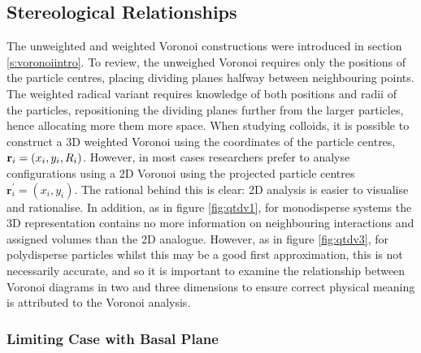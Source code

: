 \subsection{Stereological Relationships}
\label{sec:vorrel}

The unweighted and weighted Voronoi constructions were introduced in section \ref{s:voronoiintro}.
To review, the unweighed Voronoi requires only the positions of the particle centres, placing dividing planes halfway between neighbouring points.
The weighted radical variant requires knowledge of both positions and radii of the particles, repositioning the dividing planes further from the larger particles, hence allocating more them more space.
When studying \qtd{} colloids, it is possible to construct a 3D weighted Voronoi using the coordinates of the particle centres, $\mathbf{r}_i=\left(x_i,y_i,R_i\right)$.
However, in most cases researchers prefer to analyse configurations using a 2D Voronoi using the projected particle centres $\mathbf{r}_i^\prime=\left(x_i,y_i\right)$. 
The rational behind this is clear: 2D analysis is easier to visualise and rationalise.
In addition, as in figure \ref{fig:qtdv1}, for monodisperse systems the 3D representation contains no more information on neighbouring interactions and assigned volumes than the 2D analogue.
However, as in figure \ref{fig:qtdv3}, for polydisperse particles whilst this may be a good first approximation, this is not necessarily accurate, and so it is important to examine the relationship between Voronoi diagrams in two and three dimensions to ensure correct physical meaning is attributed to the Voronoi analysis.

\subsubsection{Limiting Case with Basal Plane}


